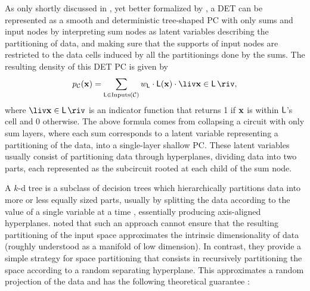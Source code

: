 As only shortly discussed in , yet better formalized by \citet{correia20}, a DET can
be represented as a smooth and deterministic tree-shaped PC with only sums and input nodes by
interpreting sum nodes as latent variables describing the partitioning of data, and making sure
that the supports of input nodes are restricted to the data cells induced by all the partitionings
done by the sums. The resulting density of this DET PC is given by
\begin{equation}
  p_\mathcal{C}(\set{x})=\sum_{\Leaf\in\operatorname{Inputs}(\mathcal{C})}w_{\Leaf}\cdot\Leaf(\set{x})\cdot\liv\set{x}\in\Leaf\riv,
\end{equation}
where $\liv\set{x}\in\Leaf\riv$ is an indicator function that returns 1 if $\mathbf{x}$ is within
$\operatorname{\textup{\textsf{L}}}$'s cell and 0 otherwise. The above formula comes from collapsing a circuit with only sum
layers, where each sum corresponds to a latent variable representing a partitioning of the data,
into a single-layer shallow PC. These latent variables usually consist of partitioning data through
hyperplanes, dividing data into two parts, each represented as the subcircuit rooted at each child
of the sum node.

A $k$-d tree is a subclass of decision trees which hierarchically partitions data into more or less
equally sized parts, usually by splitting the data according to the value of a single variable at a
time \citep{bentley75,hang19,ho95}, essentially producing axis-aligned hyperplanes.
\citet{dasgupta08b} noted that such an approach cannot ensure that the resulting partitioning of
the input space approximates the intrinsic dimensionality of data (roughly understood as a manifold
of low dimension). In contrast, they provide a simple strategy for space partitioning that consists
in recursively partitioning the space according to a random separating hyperplane. This
approximates a random projection of the data and has the following theoretical guarantee
\citep{dasgupta08b}:

